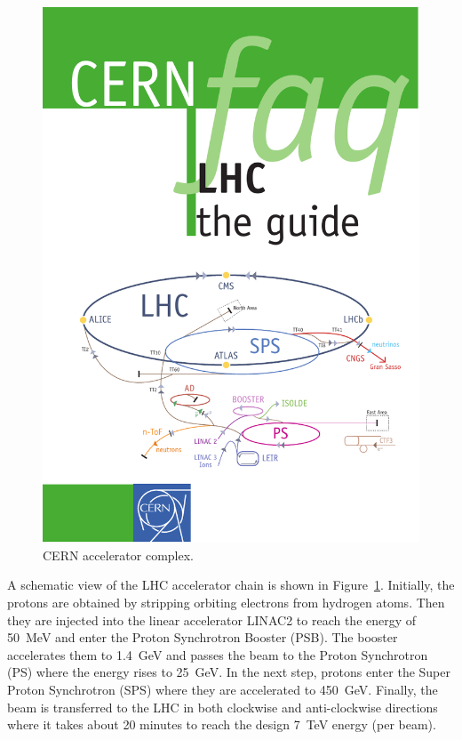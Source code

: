 \begin{figure}[!htbp]
  \begin{center}
    \leavevmode
    \includegraphics[width=\columnwidth]{LHC}
    \caption{CERN accelerator complex.}
    \label{LHC}
  \end{center}
\end{figure}

A schematic view of the LHC accelerator chain is shown in Figure~\ref{LHC}. Initially, the protons are obtained by
stripping orbiting electrons from hydrogen atoms. Then they are injected into the linear accelerator LINAC2 to reach the
energy of \SI{50}{\MeV} and enter the Proton Synchrotron Booster (PSB). The booster accelerates them to \SI{1.4}{\GeV}
and passes the beam to the Proton Synchrotron (PS) where the energy rises to \SI{25}{\GeV}. In the next step, protons
enter the Super Proton Synchrotron (SPS) where they are accelerated to \SI{450}{\GeV}. Finally, the beam is transferred
to the LHC in both clockwise and anti-clockwise directions where it takes about 20 minutes to reach the design
\SI{7}{\TeV} energy (per beam).

